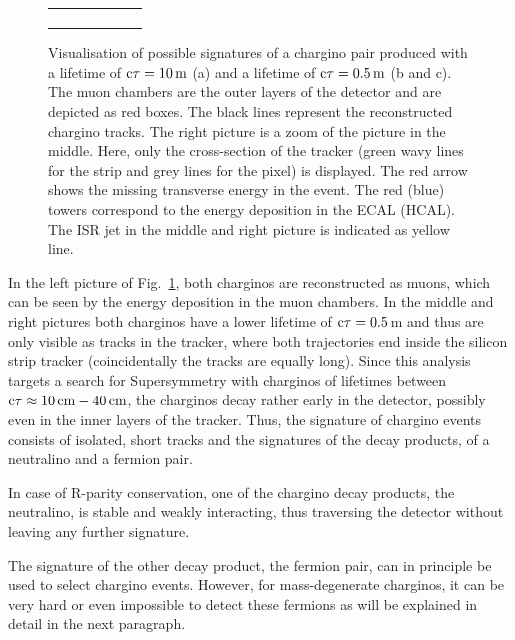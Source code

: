 \begin{figure}[!t]
\begin{tabular}{c}
\begin{subfigure}{0.31\textwidth}
      \caption{}
  \end{subfigure} 
  \end{tabular}
  \caption{Visualisation of possible signatures of a chargino pair produced with a lifetime of $\text{c}\tau = 10\,\text{m}$ (a) and a lifetime of $\text{c}\tau = 0.5\,\text{m}$ (b and c). 
           The muon chambers are the outer layers of the detector and are depicted as red boxes.
           The black lines represent the reconstructed chargino tracks.
           The right picture is a zoom of the picture in the middle. 
           Here, only the cross-section of the tracker (green wavy lines for the strip and grey lines for the pixel) is displayed. The red arrow shows the missing transverse energy in the event.
           The red (blue) towers correspond to the energy deposition in the ECAL (HCAL).
           The ISR jet in the middle and right picture is indicated as yellow line.} 
  \label{fig:CharginoPaiEventDisplay}
\end{figure}
In the left picture of Fig.~\ref{fig:CharginoPaiEventDisplay}, both charginos are reconstructed as muons, which can be seen by the energy deposition in the muon chambers.
In the middle and right pictures both charginos have a lower lifetime of $\text{c}\tau=0.5\,$m and thus are only visible as tracks in the tracker, where both trajectories end inside the silicon strip tracker (coincidentally the tracks are equally long).
Since this analysis targets a search for Supersymmetry with charginos of lifetimes between $\text{c}\tau \approx 10\,\text{cm} - 40\,\text{cm}$, the charginos decay rather early in the detector, possibly even in the inner layers of the tracker.
Thus, the signature of chargino events consists of isolated, short tracks and the signatures of the decay products, \ie of a neutralino and a fermion pair. 

In case of R-parity conservation, one of the chargino decay products, the neutralino, is stable and weakly interacting, thus traversing the detector without leaving any further signature.

The signature of the other decay product, the fermion pair, can in principle be used to select chargino events. 
However, for mass-degenerate charginos, it can be very hard or even impossible to detect these fermions as will be explained in detail in the next paragraph.

